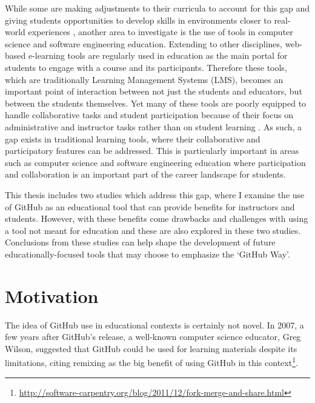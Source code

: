 While some are making adjustments to their curricula to account for this gap \cite{jazayeri2004education} and giving students opportunities to develop skills in environments closer to real-world experiences \cite{coleman2012collaboration}, another area to investigate is the use of tools in computer science and software engineering education. Extending to other disciplines, web-based e-learning tools are regularly used in education as the main portal for students to engage with a course and its participants. Therefore these tools, which are traditionally Learning Management Systems (LMS), becomes an important point of interaction between not just the students and educators, but between the students themselves. Yet many of these tools are poorly equipped to handle collaborative tasks and student participation because of their focus on administrative and instructor tasks rather than on student learning \cite{mcloughlin2007social}. As such, a gap exists in traditional learning tools, where their collaborative and participatory features can be addressed. This is particularly important in areas such as computer science and software engineering education where participation and collaboration is an important part of the career landscape for students.


This thesis includes two studies which address this gap, where I examine the use of GitHub as an educational tool that can provide benefits for instructors and students. However, with these benefits come drawbacks and challenges with using a tool not meant for education and these are also explored in these two studies. Conclusions from these studies can help shape the development of future educationally-focused tools that may choose to emphasize the `GitHub Way'.

\section{Motivation}
The idea of GitHub use in educational contexts is certainly not novel. In 2007, a few years after GitHub's release, a well-known computer science educator, Greg Wilson, suggested that GitHub could be used for learning materials despite its limitations, citing remixing as the big benefit of using GitHub in this context\footnote{\url{http://software-carpentry.org/blog/2011/12/fork-merge-and-share.html}}.

